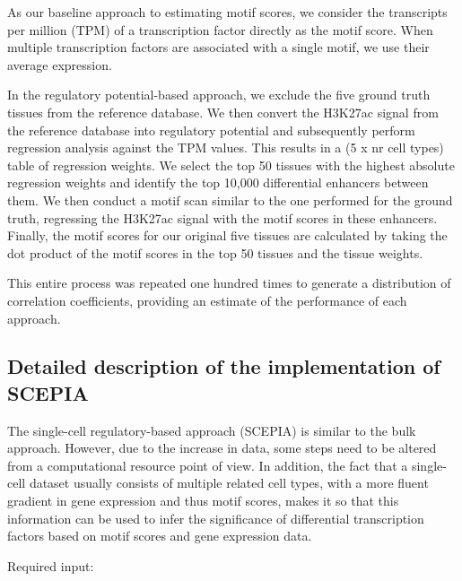 As our baseline approach to estimating motif scores, we consider the transcripts per million (TPM) of a transcription factor directly as the motif score. When multiple transcription factors are associated with a single motif, we use their average expression.

In the regulatory potential-based approach, we exclude the five ground truth tissues from the reference database. We then convert the H3K27ac signal from the reference database into regulatory potential and subsequently perform regression analysis against the TPM values. This results in a (5 x nr cell types) table of regression weights. We select the top 50 tissues with the highest absolute regression weights and identify the top 10,000 differential enhancers between them. We then conduct a motif scan similar to the one performed for the ground truth, regressing the H3K27ac signal with the motif scores in these enhancers. Finally, the motif scores for our original five tissues are calculated by taking the dot product of the motif scores in the top 50 tissues and the tissue weights.

This entire process was repeated one hundred times to generate a distribution of correlation coefficients, providing an estimate of the performance of each approach.

\subsection{Detailed description of the implementation of SCEPIA}\label{section:scepia_implementation}

The single-cell regulatory-based approach (SCEPIA) is similar to the bulk approach. However, due to the  increase in data, some steps need to be altered from a computational resource point of view. In addition, the fact that a single-cell dataset usually consists of multiple related cell types, with a more fluent gradient in gene expression and thus motif scores, makes it so that this information can be used to infer the significance of differential transcription factors based on motif scores and gene expression data.

\noindent
Required input:


